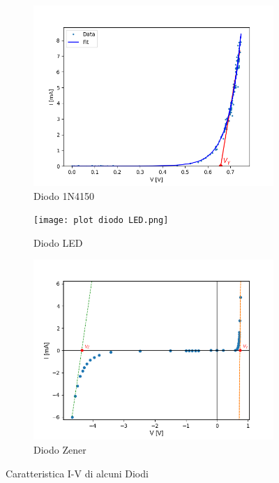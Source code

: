 \begin{figure}
	\centering
	\begin{subfigure}{0.32\textwidth}
		\includegraphics[width=\textwidth]{diodo 1N.png}
		\caption{Diodo 1N4150}
		\label{Plot 1N4150}
	\end{subfigure}
	\begin{subfigure}{0.32\textwidth}
		\texttt{[image: plot diodo LED.png]}
		\caption{Diodo LED}
		\label{Plot diodo LED}
	\end{subfigure}
	\begin{subfigure}{0.32\textwidth}
		\centering
		\includegraphics[width=\textwidth]{Caratteristica zener.png}
		\caption{Diodo Zener}
		\label{Zener}
	\end{subfigure}
	\caption{Caratteristica I-V di alcuni Diodi}
	\label{I-V diodi}
\end{figure}
